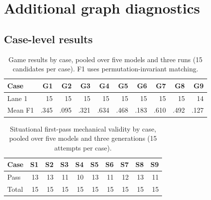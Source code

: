 \documentclass{article}
\begin{document}
{
\small






}



\appendix

\section{Additional graph diagnostics}
\subsection{Case-level results}
\begin{table}[h]
\centering
\small
\caption{Game results by case, pooled over five models and three runs (15 candidates per case). F1 uses permutation-invariant matching.}
\label{tab:game_cases}
\begin{tabular}{lrrrrrrrrr}
\toprule
Case & G1 & G2 & G3 & G4 & G5 & G6 & G7 & G8 & G9 \\
\midrule
Lane 1 & 15 & 15 & 15 & 15 & 15 & 15 & 15 & 15 & 14 \\
Mean F1 & .345 & .095 & .321 & .634 & .468 & .183 & .610 & .492 & .127 \\
\bottomrule
\end{tabular}
\end{table}

\begin{table}[h]
\centering
\small
\caption{Situational first-pass mechanical validity by case, pooled over five models and three generations (15 attempts per case).}
\label{tab:situational_cases}
\begin{tabular}{lrrrrrrrrr}
\toprule
Case & S1 & S2 & S3 & S4 & S5 & S6 & S7 & S8 & S9 \\
\midrule
Pass & 13 & 13 & 11 & 10 & 13 & 11 & 12 & 13 & 11 \\
Total & 15 & 15 & 15 & 15 & 15 & 15 & 15 & 15 & 15 \\
\bottomrule
\end{tabular}
\end{table}
\end{document}
